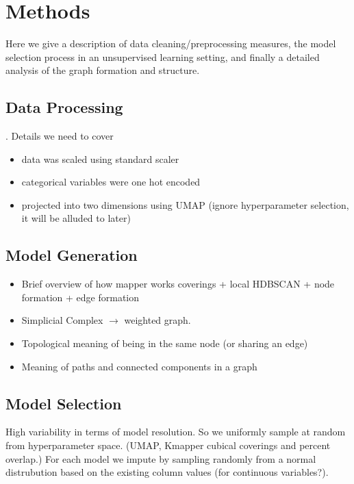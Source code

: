 \section{Methods}

Here we give a description of data cleaning/preprocessing measures, the model selection 
process in an unsupervised learning setting, and finally a detailed analysis of the 
graph formation and structure. 


\subsection{Data Processing}

. 
Details we need to cover
\begin{itemize}
    \item data was scaled using standard scaler 
    \item categorical variables were one hot encoded 
    \item projected into two dimensions using UMAP (ignore hyperparameter selection, 
    it will be alluded to later)
\end{itemize}


\subsection{Model Generation}

\begin{itemize}
    \item Brief overview of how mapper works coverings + local HDBSCAN + node formation + edge formation
    \item Simplicial Complex $\to$ weighted graph.
    \item Topological meaning of being in the same node (or sharing an edge)
    \item Meaning of paths and connected components in a graph 
\end{itemize}


\subsection{Model Selection}
High variability in terms of model resolution. So we uniformly sample at random
from hyperparameter space. (UMAP, Kmapper cubical coverings and percent overlap.)
For each model we impute by sampling randomly from a normal distrubution based on
the existing column values (for continuous variables?).

